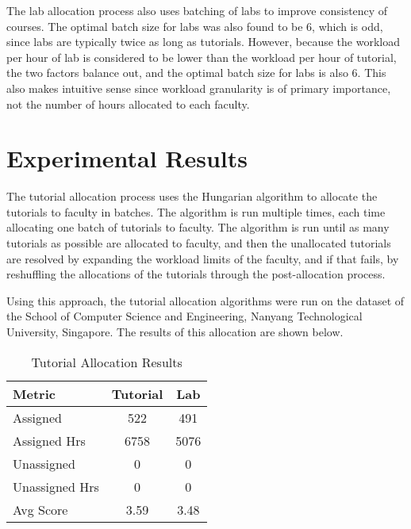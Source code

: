 The lab allocation process also uses batching of labs to improve consistency of courses. The optimal batch size for labs was also found to be 6, which is odd, since labs are typically twice as long as tutorials. However, because the workload per hour of lab is considered to be lower than the workload per hour of tutorial, the two factors balance out, and the optimal batch size for labs is also 6. This also makes intuitive sense since workload granularity is of primary importance, not the number of hours allocated to each faculty.


\section{Experimental Results}

The tutorial allocation process uses the Hungarian algorithm to allocate the tutorials to faculty in batches. The algorithm is run multiple times, each time allocating one batch of tutorials to faculty. The algorithm is run until as many tutorials as possible are allocated to faculty, and then the unallocated tutorials are resolved by expanding the workload limits of the faculty, and if that fails, by reshuffling the allocations of the tutorials through the post-allocation process.

Using this approach, the tutorial allocation algorithms were run on the dataset of the School of Computer Science and Engineering, Nanyang Technological University, Singapore. The results of this allocation are shown below.

\begin{table}[h]
  \centering
  \begin{tabular}{|l|c|c|}
    \hline
    \textbf{Metric} & \textbf{Tutorial} & \textbf{Lab} \\ \hline
    Assigned        & 522               & 491          \\
    Assigned Hrs    & 6758              & 5076         \\ \hline
    Unassigned      & 0                 & 0            \\
    Unassigned Hrs  & 0                 & 0            \\ \hline
    Avg Score       & 3.59              & 3.48         \\
    \hline
  \end{tabular}
  \caption{Tutorial Allocation Results}
  \label{tab:tut_lab_allocation_results}
\end{table}

